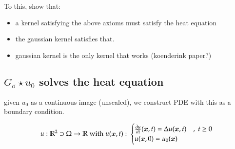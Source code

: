 		

	 To this, show that:
		 \begin{itemize}
		 	\item a kernel satisfying the above axioms must satisfy the heat equation
		 	\item the gaussian kernel satisfies that.
		 	\item gaussian kernel is the only kernel that works (koenderink paper?)
		 \end{itemize}


\subsection{$G_\sigma \star u_0$ solves the heat equation}
	given $u_0$ as a continuous image (unscaled), we construct PDE with this as a boundary condition.
	
	\begin{equation}
		u: \mathbb{R}^2 \supset \Omega \to \mathbb{R} \; \textrm{with} \; u(\bm{x},t) : \;
			\begin{cases}
				\frac{\partial u}{\partial t} (\bm{x}, t) = \Delta u(\bm{x},t) & ,\; t \ge 0 \\
				u(\bm{x},0) = u_0(\bm{x}) 
			\end{cases}
		\end{equation}

